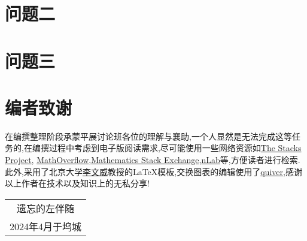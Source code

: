 \section{问题二}
\section{问题三}
\section{编者致谢}
在编撰整理阶段承蒙平展讨论班各位的理解与襄助,一个人显然是无法完成这等任务的,在编撰过程中考虑到电子版阅读需求,尽可能使用一些网络资源如\href{https://stacks.math.columbia.edu/}{The Stacks Project}, \href{https://mathoverflow.net/}{MathOverflow},\href{https://math.stackexchange.com/}{Mathematics Stack Exchange},\href{https://ncatlab.org/nlab/show/HomePage}{nLab}等,方便读者进行检索.\\
此外,采用了北京大学\href{https://www.wwli.asia/index.php/zh/}{李文威}教授的LaTeX模板,交换图表的编辑使用了\href{https://q.uiver.app/}{quiver},感谢以上作者在技术以及知识上的无私分享!

\begin{flushright}\begin{minipage}{0.3 \textwidth}
	\begin{tabular}{c}
		{\kaishu 遗忘的左伴随} \\
		2024年4月于坞城
	\end{tabular}
\end{minipage}\end{flushright}
\vspace{1em}